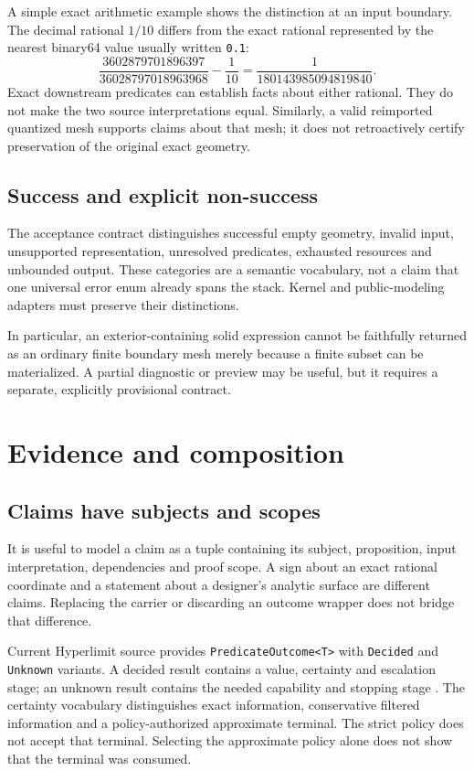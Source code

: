 \documentclass[11pt]{article}
\begin{document}
A simple exact arithmetic example shows the distinction at an input boundary.
The decimal rational $1/10$ differs from the exact rational represented by the
nearest binary64 value usually written \texttt{0.1}:
\[
 \frac{3602879701896397}{36028797018963968}-\frac{1}{10}
 =\frac{1}{180143985094819840}.
\]
Exact downstream predicates can establish facts about either rational.
They do not make the two source interpretations equal. Similarly, a valid
reimported quantized mesh supports claims about that mesh; it does not
retroactively certify preservation of the original exact geometry.

\subsection{Success and explicit non-success}
The acceptance contract distinguishes successful empty geometry, invalid input,
unsupported representation, unresolved predicates, exhausted resources and
unbounded output. These categories are a semantic vocabulary, not a claim that
one universal error enum already spans the stack. Kernel and public-modeling
adapters must preserve their distinctions.

In particular, an exterior-containing solid expression cannot be faithfully
returned as an ordinary finite boundary mesh merely because a finite subset
can be materialized. A partial diagnostic or preview may be useful, but it
requires a separate, explicitly provisional contract.

\section{Evidence and composition}
\subsection{Claims have subjects and scopes}
It is useful to model a claim as a tuple containing its subject, proposition,
input interpretation, dependencies and proof scope. A sign about an exact
rational coordinate and a statement about a designer's analytic surface are
different claims. Replacing the carrier or discarding an outcome wrapper does
not bridge that difference.

Current Hyperlimit source provides \texttt{PredicateOutcome<T>} with
\texttt{Decided} and \texttt{Unknown} variants. A decided result contains a
value, certainty and escalation stage; an unknown result contains the needed
capability and stopping stage \cite{implementation}.
The certainty vocabulary distinguishes exact information, conservative filtered
information and a policy-authorized approximate terminal. The strict policy
does not accept that terminal. Selecting the approximate policy alone does not
show that the terminal was consumed.
\end{document}
